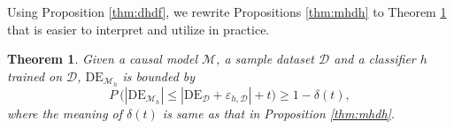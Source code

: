 \documentclass{article}
\newtheorem{theorem}{Theorem}
\begin{document}
Using Proposition \ref{thm:dhdf}, we rewrite Propositions \ref{thm:mhdh} to Theorem \ref{thm:mh} that is easier to interpret and utilize in practice.


%

\begin{theorem}\label{thm:mh}
Given a causal model $\mathcal{M}$, a sample dataset $\mathcal{D}$ and a classifier $h$ trained on $\mathcal{D}$, $\mathrm{DE}_{\mathcal{M}_{h}}$ is bounded by
\begin{equation*}
P~ \Bigg( \left|\mathrm{DE}_{\mathcal{M}_{h}}\right| \leq \left|\mathrm{DE}_{\mathcal{D}}+\varepsilon_{h,\mathcal{D}}\right| + t \Bigg) \geq 1-\delta(t),
\end{equation*}
where the meaning of $\delta(t)$ is same as that in Proposition \ref{thm:mhdh}.
\end{theorem}

\end{document}
